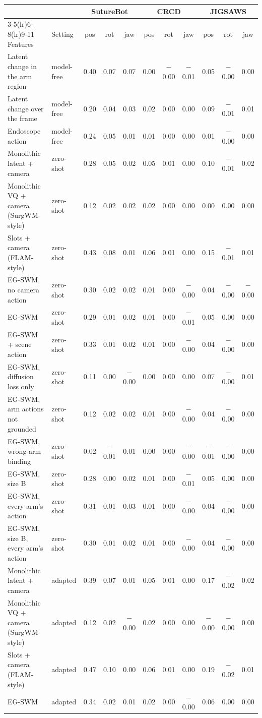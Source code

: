 \begin{tabular}{llccccccccc}
\toprule
 & & \multicolumn{3}{c}{SutureBot} & \multicolumn{3}{c}{CRCD} & \multicolumn{3}{c}{JIGSAWS} \\
\cmidrule(lr){3-5}\cmidrule(lr){6-8}\cmidrule(lr){9-11}
Features & Setting & pos & rot & jaw & pos & rot & jaw & pos & rot & jaw \\
\midrule
Latent change in the arm region & model-free & 0.40 & 0.07 & 0.07 & 0.00 & $-$0.00 & $-$0.01 & 0.05 & $-$0.00 & 0.00 \\
Latent change over the frame & model-free & 0.20 & 0.04 & 0.03 & 0.02 & 0.00 & 0.00 & 0.09 & $-$0.01 & 0.01 \\
Endoscope action & model-free & 0.24 & 0.05 & 0.01 & 0.01 & 0.00 & 0.00 & 0.01 & $-$0.00 & 0.00 \\
\midrule
Monolithic latent + camera & zero-shot & 0.28 & 0.05 & 0.02 & 0.05 & 0.01 & 0.00 & 0.10 & $-$0.01 & 0.02 \\
Monolithic VQ + camera (SurgWM-style) & zero-shot & 0.12 & 0.02 & 0.02 & 0.02 & 0.00 & 0.00 & 0.00 & 0.00 & 0.00 \\
Slots + camera (FLAM-style) & zero-shot & 0.43 & 0.08 & 0.01 & 0.06 & 0.01 & 0.00 & 0.15 & $-$0.01 & 0.01 \\
EG-SWM, no camera action & zero-shot & 0.30 & 0.02 & 0.02 & 0.01 & 0.00 & $-$0.00 & 0.04 & $-$0.00 & $-$0.00 \\
EG-SWM & zero-shot & 0.29 & 0.01 & 0.02 & 0.01 & 0.00 & $-$0.01 & 0.05 & 0.00 & 0.00 \\
EG-SWM + scene action & zero-shot & 0.33 & 0.01 & 0.02 & 0.01 & 0.00 & $-$0.00 & 0.04 & $-$0.00 & 0.00 \\
EG-SWM, diffusion loss only & zero-shot & 0.11 & 0.00 & $-$0.00 & 0.00 & 0.00 & 0.00 & 0.07 & $-$0.00 & 0.01 \\
EG-SWM, arm actions not grounded & zero-shot & 0.12 & 0.02 & 0.02 & 0.01 & 0.00 & $-$0.00 & 0.04 & $-$0.00 & 0.00 \\
EG-SWM, wrong arm binding & zero-shot & 0.02 & $-$0.01 & 0.01 & 0.00 & 0.00 & $-$0.00 & $-$0.01 & $-$0.00 & 0.00 \\
EG-SWM, size B & zero-shot & 0.28 & 0.00 & 0.02 & 0.01 & 0.00 & $-$0.01 & 0.05 & 0.00 & 0.00 \\
EG-SWM, every arm's action & zero-shot & 0.31 & 0.01 & 0.03 & 0.01 & 0.00 & $-$0.00 & 0.04 & $-$0.00 & 0.00 \\
EG-SWM, size B, every arm's action & zero-shot & 0.30 & 0.01 & 0.02 & 0.01 & 0.00 & $-$0.00 & 0.04 & $-$0.00 & 0.00 \\
\midrule
Monolithic latent + camera & adapted & 0.39 & 0.07 & 0.01 & 0.05 & 0.01 & 0.00 & 0.17 & $-$0.02 & 0.02 \\
Monolithic VQ + camera (SurgWM-style) & adapted & 0.12 & 0.02 & $-$0.00 & 0.02 & 0.00 & 0.00 & $-$0.00 & $-$0.00 & 0.00 \\
Slots + camera (FLAM-style) & adapted & 0.47 & 0.10 & 0.00 & 0.06 & 0.01 & 0.00 & 0.19 & $-$0.02 & 0.01 \\
EG-SWM & adapted & 0.34 & 0.02 & 0.01 & 0.02 & 0.00 & $-$0.00 & 0.06 & 0.00 & 0.00 \\
\bottomrule
\end{tabular}
